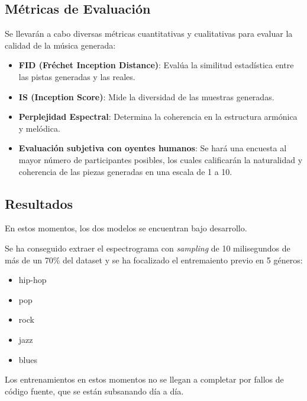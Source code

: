 \subsection{Métricas de Evaluación}
Se llevarán a cabo diversas métricas cuantitativas y cualitativas para evaluar la calidad de la música generada:
\begin{itemize}
\item \textbf{FID (Fréchet Inception Distance)}: Evalúa la similitud estadística entre las pistas generadas y las reales.
\item \textbf{IS (Inception Score)}: Mide la diversidad de las muestras generadas.
\item \textbf{Perplejidad Espectral}: Determina la coherencia en la estructura armónica y melódica.
\item \textbf{Evaluación subjetiva con oyentes humanos}: Se hará una encuesta al mayor número de participantes posibles, los cuales calificarán la naturalidad y coherencia de las piezas generadas en una escala de 1 a 10.
\end{itemize}

\subsection{Resultados}

En estos momentos, los dos modelos se encuentran bajo desarrollo.

Se ha conseguido extraer el espectrograma con \emph{sampling} de 10 milisegundos de más de un 70\% del dataset y se ha focalizado el entremaiento previo en 5 géneros:
\begin{itemize}
    \item hip-hop
    \item pop
    \item rock
    \item jazz
    \item blues
\end{itemize}

Los entrenamientos en estos momentos no se llegan a completar por fallos de código fuente, que se están subsanando día a día.